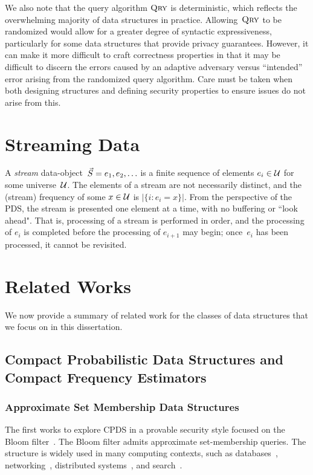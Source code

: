 We also note that the query algorithm $\textnormal{\textsc{Qry}}$ is deterministic, which reflects the overwhelming majority of data structures in practice. Allowing~$\textnormal{\textsc{Qry}}$ to be randomized would allow for a greater degree of syntactic expressiveness, particularly for some data structures that provide privacy guarantees. However, it can make it more difficult to craft correctness properties in that it may be difficult to discern the errors caused by an adaptive adversary versus ``intended'' error arising from the randomized query algorithm. Care must be taken when both designing structures and defining security properties to ensure issues do not arise from this.  

\section{Streaming Data}

A \emph{stream} data-object~$\vec{S} = e_1,e_2,\ldots$ is a finite sequence of elements $e_i \in \mathcal{U}$ for some universe~$\mathcal{U}$.  
The elements of a stream are not necessarily distinct, and the (stream) frequency of some $x \in \mathcal{U}$ is $|\{i: e_i=x \}|$.  
From the perspective of the PDS, the stream is presented one element at a time, with no buffering or ``look ahead".  
That is, processing of a stream is performed in order, and the processing of $e_i$ is completed before the processing of $e_{i+1}$ may begin; once~$e_i$ has been processed, it cannot be revisited.

\section{Related Works}

We now provide a summary of related work for the classes of data structures that we focus on in this dissertation.

\subsection{Compact Probabilistic Data Structures and Compact Frequency Estimators}

\subsubsection{Approximate Set Membership Data Structures}

The first works to explore CPDS in a provable security style focused on the Bloom filter~\cite{bloom1970space}. The Bloom filter admits approximate set-membership queries. The structure is widely used in many computing contexts, such as databases~\cite{chang2008bigtable}, networking~\cite{broder2004network}, distributed systems~\cite{tarkoma2011theory}, and search~\cite{goodwin2017bitfunnel}. 

